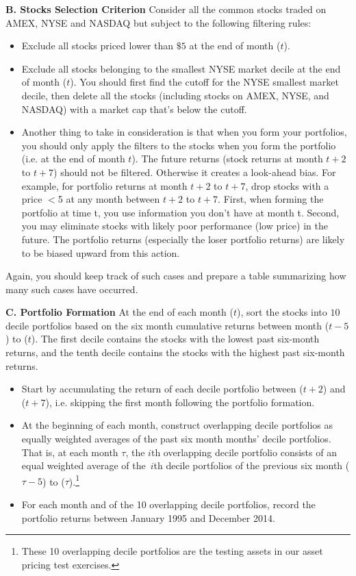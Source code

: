 \textbf{B. Stocks Selection Criterion}
Consider all the common stocks traded on AMEX, NYSE and NASDAQ but
subject to the following filtering rules:
	\begin{itemize}
	\item Exclude all stocks priced lower than $\$5$ at the end of month ($t$).
	\item Exclude all stocks belonging to the smallest NYSE market decile at the end of month ($t$). You should first find the cutoff for the NYSE smallest market decile, then delete all the stocks (including stocks on AMEX, NYSE, and NASDAQ) with a market cap that's below the cutoff.
	\item Another thing to take in consideration is that when you form your portfolios, you should only apply the filters to the stocks when you form the portfolio (i.e. at the end of month $t$). The future returns (stock returns at month $t+2$ to $t+7$) should not be filtered. Otherwise it creates a look-ahead bias. For example, for portfolio returns at month $t+2$ to $t+7$, drop stocks with a price $<$5 at any month between $t+2$ to $t+7$. First, when forming the portfolio at time t, you use information you don't have at month t. Second, you may eliminate stocks with likely poor performance (low price) in the future. The portfolio returns (especially the loser portfolio returns) are likely to be biased upward from this action. \twomedskip
\end{itemize}


Again, you should keep track of such cases and prepare a table summarizing how many such cases have occurred. \twomedskip

\textbf{C. Portfolio Formation}
At the end of each month ($t$), sort the stocks into $10$ decile portfolios based on the six month cumulative returns between month ($t-5$) to ($t$). The first decile contains the stocks with the lowest past six-month returns, and the tenth decile contains the stocks with the highest past six-month returns.
	\begin{itemize}
	\item Start by accumulating the return of each decile portfolio between ($t+2$) and ($t+7$), i.e. skipping the first month following the portfolio
formation.
	\item At the beginning of each month, construct overlapping decile portfolios as equally weighted averages of the past six month months' decile portfolios. That is, at each month $\tau $, the $i$th overlapping decile portfolio consists of an equal weighted average of the\ $i$th decile portfolios of the previous six month ($\tau -5$) to ($\tau $).\footnote{These 10 overlapping decile portfolios are the testing assets in our asset
pricing test exercises.}
	\item For each month and of the 10 overlapping decile portfolios, record the portfolio returns between January 1995 and December 2014. \twomedskip
	\end{itemize}

